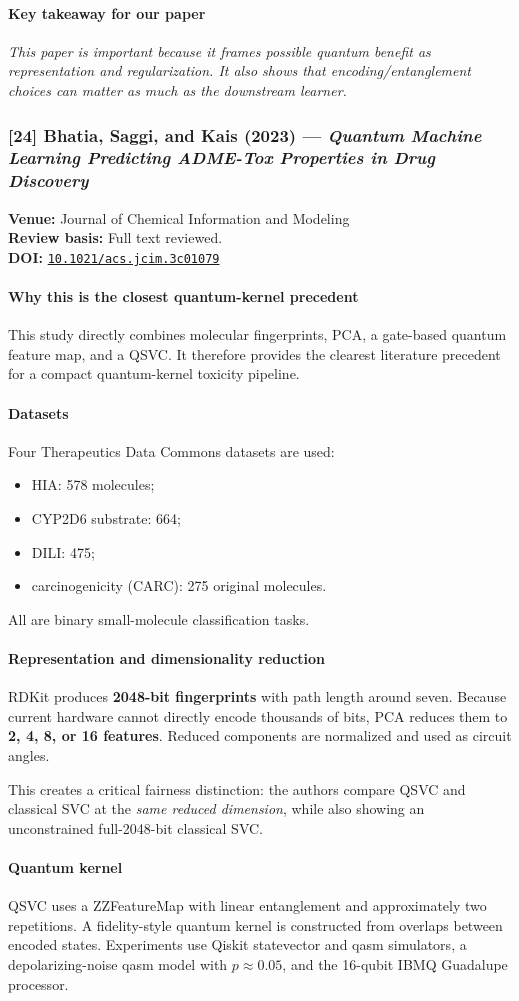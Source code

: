 \documentclass[11pt]{article}
\newcommand{\reviewfield}[2]{\paragraph{#1}#2}
\newcommand{\keytakeaway}[1]{\paragraph{Key takeaway for our paper}\emph{#1}}
\newcommand{\paperdoi}[1]{\href{https://doi.org/#1}{\texttt{#1}}}
\begin{document}
\keytakeaway{This paper is important because it frames possible quantum benefit as representation and regularization. It also shows that encoding/entanglement choices can matter as much as the downstream learner.}

\subsubsection{[24] Bhatia, Saggi, and Kais (2023) --- \textit{Quantum Machine Learning Predicting ADME-Tox Properties in Drug Discovery}}
\textbf{Venue:} Journal of Chemical Information and Modeling\\
\textbf{Review basis:} Full text reviewed.\\
\textbf{DOI:} \paperdoi{10.1021/acs.jcim.3c01079}

\reviewfield{Why this is the closest quantum-kernel precedent}{
This study directly combines molecular fingerprints, PCA, a gate-based quantum feature map, and a QSVC. It therefore provides the clearest literature precedent for a compact quantum-kernel toxicity pipeline.
}

\reviewfield{Datasets}{
Four Therapeutics Data Commons datasets are used:
\begin{itemize}
    \item HIA: 578 molecules;
    \item CYP2D6 substrate: 664;
    \item DILI: 475;
    \item carcinogenicity (CARC): 275 original molecules.
\end{itemize}
All are binary small-molecule classification tasks.
}

\reviewfield{Representation and dimensionality reduction}{
RDKit produces \textbf{2048-bit fingerprints} with path length around seven. Because current hardware cannot directly encode thousands of bits, PCA reduces them to \textbf{2, 4, 8, or 16 features}. Reduced components are normalized and used as circuit angles.

This creates a critical fairness distinction: the authors compare QSVC and classical SVC at the \emph{same reduced dimension}, while also showing an unconstrained full-2048-bit classical SVC.
}

\reviewfield{Quantum kernel}{
QSVC uses a ZZFeatureMap with linear entanglement and approximately two repetitions. A fidelity-style quantum kernel is constructed from overlaps between encoded states. Experiments use Qiskit statevector and qasm simulators, a depolarizing-noise qasm model with $p\approx0.05$, and the 16-qubit IBMQ Guadalupe processor.
}
\end{document}
